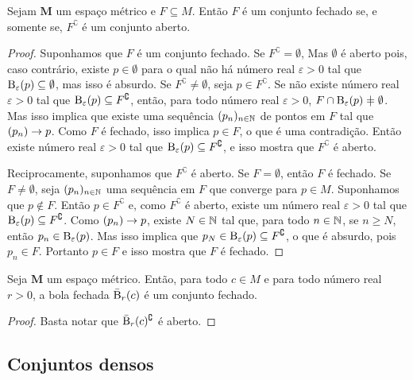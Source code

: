 \begin{proposition}
Sejam $\bm M$ um espaço métrico e $F \subseteq M$. Então $F$ é um conjunto fechado se, e somente se, $F^\complement$ é um conjunto aberto.
\end{proposition}
\begin{proof}
Suponhamos que $F$ é um conjunto fechado. Se $F^\complement = \emptyset$, Mas $\emptyset$ é aberto pois, caso contrário, existe $p \in \emptyset$ para o qual não há número real $\varepsilon > 0$ tal que $\mathrm{B}_\varepsilon(p) \subseteq \emptyset$, mas isso é absurdo. Se $F^\complement \neq \emptyset$, seja $p \in F^\complement$. Se não existe número real $\varepsilon > 0$ tal que $\mathrm{B}_\varepsilon(p) \subseteq F^\complement$, então, para todo número real $\varepsilon > 0$, $F \cap \bola_\varepsilon(p) \neq \emptyset$. Mas isso implica que existe uma sequência $(p_n)_{n \in \mathbb{N}}$ de pontos em $F$ tal que $(p_n) \rightarrow p$. Como $F$ é fechado, isso implica $p \in F$, o que é uma contradição. Então existe número real $\varepsilon > 0$ tal que $\mathrm{B}_\varepsilon(p) \subseteq F^\complement$, e isso mostra que $F^\complement$ é aberto.
	
Reciprocamente, suponhamos que $F^\complement$ é aberto. Se $F = \emptyset$, então $F$ é fechado. Se $F \neq \emptyset$, seja $(p_n)_{n \in \mathbb{N}}$ uma sequência em $F$ que converge para $p \in M$. Suponhamos que $p \notin F$. Então $p \in F^\complement$ e, como $F^\complement$ é aberto, existe um número real $\varepsilon > 0$ tal que $\mathrm{B}_\varepsilon(p) \subseteq F^\complement$. Como $(p_n) \rightarrow p$, existe $N \in \mathbb{N}$ tal que, para todo $n \in \mathbb{N}$, se $n \geq N$, então $p_n \in \mathrm{B}_\varepsilon(p)$. Mas isso implica que $p_N \in \mathrm{B}_\varepsilon(p) \subseteq F^\complement$, o que é absurdo, pois $p_n \in F$. Portanto $p \in F$ e isso mostra que $F$ é fechado.
\end{proof}

\begin{proposition}
Seja $\bm M$ um espaço métrico. Então, para todo $c \in M$ e para todo número real $r > 0$, a bola fechada $\bar{\mathrm{B}}_r(c)$ é um conjunto fechado.
\end{proposition}
\begin{proof}
Basta notar que $\bar{\mathrm{B}}_r(c)^\complement$ é aberto.
\end{proof}

\subsection{Conjuntos densos}

